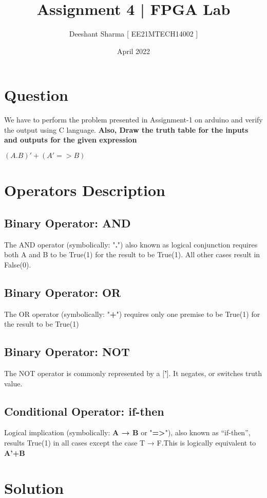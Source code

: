\documentclass{article}
\title{\textbf{Assignment 4}  |\textbf{ FPGA Lab}}
\author{Deeshant Sharma [ EE21MTECH14002 ]}
\date{April 2022}
\begin{document}
\maketitle

\section{Question}

We have to perform the problem presented in Assignment-1 on arduino and verify the output using C language.
\textbf{Also, Draw the truth table for the inputs and outputs for the given  expression}


\begin{center}
    $ ( A . B )' + (  A' => B ) $
\end{center}

\section{Operators Description}
\subsection{Binary Operator: AND}
The AND operator (symbolically: "\textbf{.}") also known as logical conjunction requires both A and B to be True(1) for the result to be True(1). All other cases result in False(0).

\subsection{Binary Operator: OR}
The OR operator (symbolically: "\textbf{+}") requires only one premise to be True(1) for the result to be True(1)

\subsection{Binary Operator: NOT}
The NOT operator is commonly represented by a [\textbf{'}]. It negates, or switches truth value.

\subsection{Conditional Operator: if-then}
Logical implication (symbolically:\textbf{ A → B} or "\textbf{=>}"), also known as “if-then”, results True(1) in all cases except the case T → F.This is logically equivalent to \textbf{A'+B}

\section{Solution}
\end{document}
